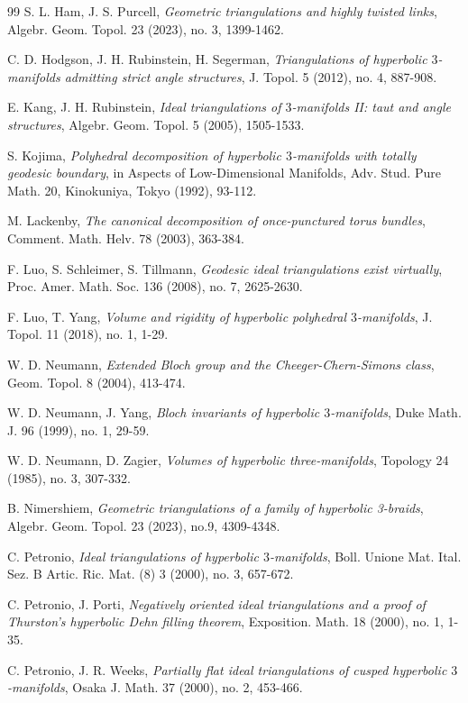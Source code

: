\documentclass[oneside,a4paper,12pt]{article}
\theoremstyle{plain}
\theoremstyle{definition}
\theoremstyle{remark}
\numberwithin{equation}{section}
\begin{document}
\begin{thebibliography}{99}
S. L. Ham, J. S. Purcell,
\emph{Geometric triangulations and highly twisted links},
Algebr. Geom. Topol. 23 (2023), no. 3,
1399-1462.

C. D. Hodgson, J. H. Rubinstein, H. Segerman,
\emph{Triangulations of hyperbolic $3$-manifolds admitting strict angle structures},
J. Topol. 5 (2012), no. 4, 887-908.

E. Kang, J. H. Rubinstein,
\emph{Ideal triangulations of $3$-manifolds II: taut and angle structures},
Algebr. Geom. Topol. 5 (2005), 1505-1533.

S. Kojima,
\emph{Polyhedral decomposition of hyperbolic $3$-manifolds with totally geodesic boundary},
in Aspects of Low-Dimensional Manifolds,
Adv. Stud. Pure Math. 20, Kinokuniya,
Tokyo (1992), 93-112.

M. Lackenby,
\emph{The canonical decomposition of once-punctured torus bundles}, Comment. Math. Helv. 78
(2003), 363-384.

F. Luo, S. Schleimer, S. Tillmann,
\emph{Geodesic ideal triangulations exist virtually},
Proc. Amer. Math. Soc. 136 (2008), no. 7,
2625-2630.

F. Luo, T. Yang,
\emph{Volume and rigidity of hyperbolic polyhedral $3$-manifolds},
J. Topol. 11 (2018), no. 1, 1-29.

W. D. Neumann,
\emph{Extended Bloch group and the Cheeger-Chern-Simons class},
Geom. Topol. 8 (2004), 413-474.

W. D. Neumann, J. Yang,
\emph{Bloch invariants of hyperbolic $3$-manifolds},
Duke Math. J. 96 (1999), no. 1, 29-59.

W. D. Neumann, D. Zagier,
\emph{Volumes of hyperbolic three-manifolds},
Topology 24 (1985), no. 3, 307-332.

B. Nimershiem,
\emph{Geometric triangulations of a family of hyperbolic 3-braids}, Algebr. Geom. Topol. 23
(2023), no.9, 4309-4348.

C. Petronio,
\emph{Ideal triangulations of hyperbolic $3$-manifolds},
Boll. Unione Mat. Ital. Sez. B Artic. Ric. Mat.
(8) 3 (2000), no. 3, 657-672.

C. Petronio, J. Porti,
\emph{Negatively oriented ideal triangulations and a proof of Thurston's hyperbolic Dehn filling theorem},
Exposition. Math. 18 (2000), no. 1, 1-35.

C. Petronio, J. R. Weeks,
\emph{Partially flat ideal triangulations of cusped hyperbolic $3$-manifolds},
Osaka J. Math. 37 (2000), no. 2, 453-466.


\end{thebibliography}
\end{document}
